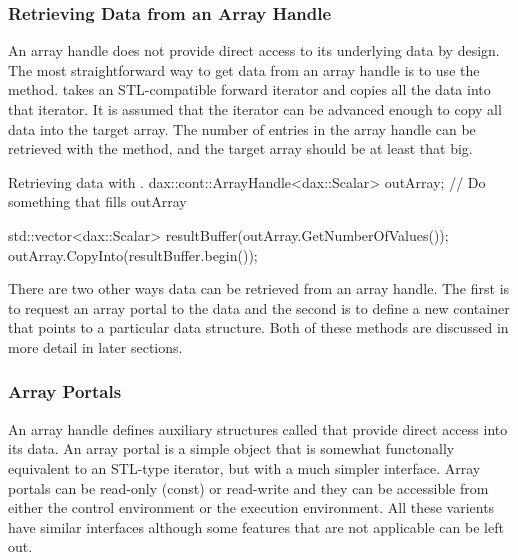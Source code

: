 \subsubsection{Retrieving Data from an Array Handle}

An array handle does not provide direct access to its underlying data by
design. The most straightforward way to get data from an array handle is to
use the  method.  takes an
STL-compatible forward iterator and copies all the data into that
iterator. It is assumed that the iterator can be advanced enough to copy
all data into the target array. The number of entries in the array handle
can be retrieved with the  method, and the
target array should be at least that big.

\begin{daxexample}{Retrieving  data with .}
dax::cont::ArrayHandle<dax::Scalar> outArray;
// Do something that fills outArray

std::vector<dax::Scalar> resultBuffer(outArray.GetNumberOfValues());
outArray.CopyInto(resultBuffer.begin());
\end{daxexample}

There are two other ways data can be retrieved from an array handle. The
first is to request an array portal to the data and the second is to define
a new container that points to a particular data structure. Both of these
methods are discussed in more detail in later sections.

\subsubsection{Array Portals}
\label{sec:ArrayPortals}


An array handle defines auxiliary structures called 
that provide direct access into its data. An array portal is a simple
object that is somewhat functonally equivalent to an STL-type iterator, but
with a much simpler interface. Array portals can be read-only (const) or
read-write and they can be accessible from either the control environment
or the execution environment. All these varients have similar interfaces
although some features that are not applicable can be left out.


